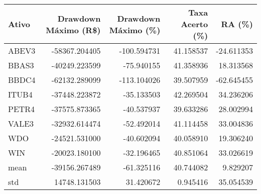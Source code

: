 \begin{tabular}{lrrrr}
\toprule
Ativo &  Drawdown Máximo (R\$) &  Drawdown Máximo (\%)  &      Taxa Acerto (\%) &  RA (\%) \\
\midrule
     ABEV3 &     -58367.204405 &                  -100.594731 & 41.158537 &          -24.611353 \\
     BBAS3 &     -40249.223599 &                   -75.940155 & 41.358936 &           18.313568 \\
     BBDC4 &     -62132.289099 &                  -113.104026 & 39.507959 &          -62.645455 \\
     ITUB4 &     -37448.223872 &                   -35.133503 & 42.269504 &           34.236206 \\
     PETR4 &     -37575.873365 &                   -40.537937 & 39.633286 &           28.002994 \\
     VALE3 &     -32932.614474 &                   -52.492014 & 41.114458 &           33.004836 \\
       WDO &     -24521.531000 &                   -40.602094 & 40.058910 &           19.306240 \\
       WIN &     -20023.180100 &                   -32.196465 & 40.851064 &           33.026619 \\
      mean &     -39156.267489 &                   -61.325116 & 40.744082 &            9.829207 \\
       std &      14748.131503 &                    31.420672 &  0.945416 &           35.054539 \\
\bottomrule
\end{tabular}
